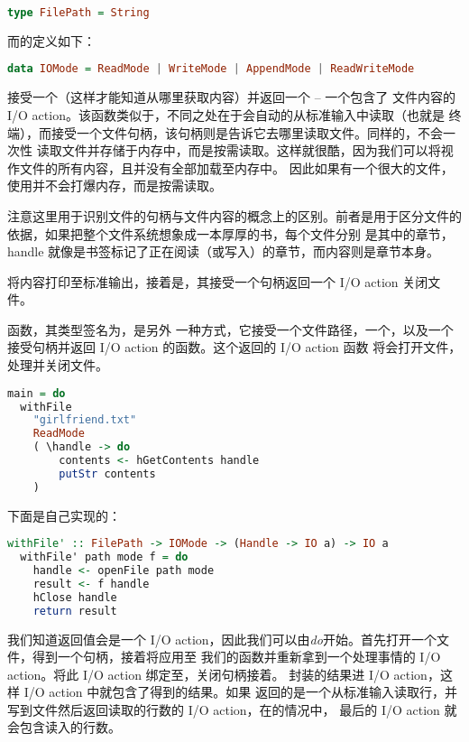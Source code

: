 \documentclass[./main.tex]{subfiles}
\begin{document}
\begin{lstlisting}[language=Haskell]
  type FilePath = String
\end{lstlisting}

而的定义如下：

\begin{lstlisting}[language=Haskell]
  data IOMode = ReadMode | WriteMode | AppendMode | ReadWriteMode
\end{lstlisting}

接受一个（这样才能知道从哪里获取内容）并返回一个 -- 一个包含了
文件内容的 I/O action。该函数类似于，不同之处在于会自动的从标准输入中读取（也就是
终端），而接受一个文件句柄，该句柄则是告诉它去哪里读取文件。同样的，不会一次性
读取文件并存储于内存中，而是按需读取。这样就很酷，因为我们可以将视作文件的所有内容，且并没有全部加载至内存中。
因此如果有一个很大的文件，使用并不会打爆内存，而是按需读取。

注意这里用于识别文件的句柄与文件内容的概念上的区别。前者是用于区分文件的依据，如果把整个文件系统想象成一本厚厚的书，每个文件分别
是其中的章节，handle 就像是书签标记了正在阅读（或写入）的章节，而内容则是章节本身。

将内容打印至标准输出，接着是，其接受一个句柄返回一个 I/O action 关闭文件。

函数，其类型签名为，是另外
一种方式，它接受一个文件路径，一个，以及一个接受句柄并返回 I/O action 的函数。这个返回的 I/O action 函数
将会打开文件，处理并关闭文件。

\begin{lstlisting}[language=Haskell]
  main = do
  withFile
    "girlfriend.txt"
    ReadMode
    ( \handle -> do
        contents <- hGetContents handle
        putStr contents
    )
\end{lstlisting}

下面是自己实现的：

\begin{lstlisting}[language=Haskell]
  withFile' :: FilePath -> IOMode -> (Handle -> IO a) -> IO a
  withFile' path mode f = do
    handle <- openFile path mode
    result <- f handle
    hClose handle
    return result
\end{lstlisting}

我们知道返回值会是一个 I/O action，因此我们可以由\textit{do}开始。首先打开一个文件，得到一个句柄，接着将应用至
我们的函数并重新拿到一个处理事情的 I/O action。将此 I/O action 绑定至，关闭句柄接着。
封装的结果进 I/O action，这样 I/O action 中就包含了得到的结果。如果
返回的是一个从标准输入读取行，并写到文件然后返回读取的行数的 I/O action，在的情况中，
最后的 I/O action 就会包含读入的行数。
\end{document}
